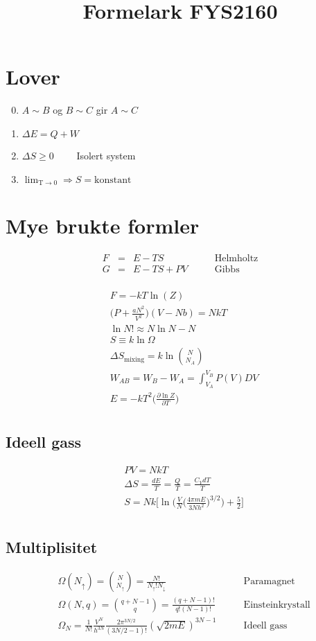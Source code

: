 \documentclass{article}
\begin{document}
\title{Formelark FYS2160}
\begin{multicols}{2}
\section*{Lover}
\begin{enumerate}
\setcounter{enumi}{-1}
\item $A\sim B$ og $B\sim C$ gir $A\sim C$
\item $\Delta E=Q+W$
\item $\Delta S\ge 0 \qquad$ Isolert system
\item $\lim_{\text{T} \to 0}\Rightarrow S = \text{konstant}$
\end{enumerate}

\section*{Mye brukte formler}
$$\begin{aligned}
F&=&E-TS\qquad&\text{Helmholtz}\\
G&=&E-TS+PV\qquad&\text{Gibbs}\\
\end{aligned}$$

$$\begin{aligned}
&F=-kT\ln(Z)\\
&\bigg(P+\frac{aN^2}{V^2}\bigg)(V-Nb)=NkT\\
&\ln N! \approx N\ln N - N\\
&S\equiv k\ln\Omega\\
&\Delta S_{\text{mixing}}=k\ln\binom{N}{N_A}\\
&W_{AB}=W_B-W_A=\int_{V_A}^{V_B}P(V)DV\\
&E=-kT^2\bigg(\frac{\partial\ln Z}{\partial T}\bigg)\\
\end{aligned}$$

\subsection*{Ideell gass}
$$\begin{aligned}
&PV=NkT\\
&\Delta S=\frac{dE}{T}=\frac{Q}{T}=\frac{C_VdT}{T}\\
&S=Nk\Bigg[\ln\Bigg(\frac{V}{N}\bigg(\frac{4\pi mE}{3Nh^2}\bigg)^{3/2}\Bigg)+\frac{5}{2}\Bigg]\\
\end{aligned}$$
\columnbreak
\subsection*{Multiplisitet}
$$\begin{aligned}
&\Omega(N_{\uparrow})=\binom{N}{N_{\uparrow}}=\frac{N!}{N_{\uparrow}!N_{\downarrow}}\qquad&\text{Paramagnet}\\
&\Omega(N,q)=\binom{q+N-1}{q}=\frac{(q+N-1)!}{q!(N-1)!}\qquad&\text{Einsteinkrystall}\\
&\Omega_N=\frac{1}{N!}\frac{V^N}{h^{3N}}\frac{2\pi^{3N/2}}{(3N/2-1)!}(\sqrt{2mE})^{3N-1}\qquad&\text{Ideell gass}
\end{aligned}$$

\end{multicols}
\end{document}
